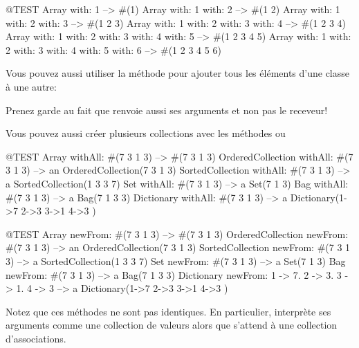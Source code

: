 \documentclass[a4paper,10pt,twoside]{book}
\begin{document}
\begin{code}{@TEST}
Array with: 1 --> #(1)
Array with: 1 with: 2 --> #(1 2)
Array with: 1 with: 2 with: 3 --> #(1 2 3)
Array with: 1 with: 2 with: 3 with: 4 --> #(1 2 3 4)
Array with: 1 with: 2 with: 3 with: 4 with: 5 --> #(1 2 3 4 5)
Array with: 1 with: 2 with: 3 with: 4 with: 5 with: 6 --> #(1 2 3 4 5 6)
\end{code}

Vous pouvez aussi utiliser la méthode  pour ajouter tous les éléments d'une classe à une autre:


\noindent
Prenez garde au fait que  renvoie aussi ses arguments et non pas le receveur!

Vous pouvez aussi créer plusieurs collections avec les méthodes  
 ou 

\begin{code}{@TEST}
Array withAll: #(7 3 1 3)                      --> #(7 3 1 3)
OrderedCollection withAll: #(7 3 1 3) --> an OrderedCollection(7 3 1 3)
SortedCollection withAll: #(7 3 1 3)    --> a SortedCollection(1 3 3 7)
Set withAll: #(7 3 1 3)                         --> a Set(7 1 3)
Bag withAll: #(7 3 1 3)                        --> a Bag(7 1 3 3)
Dictionary withAll: #(7 3 1 3)               --> a Dictionary(1->7 2->3 3->1 4->3 )
\end{code}

\begin{code}{@TEST}
Array newFrom: #(7 3 1 3)                                          --> #(7 3 1 3)
OrderedCollection newFrom: #(7 3 1 3)                     --> an OrderedCollection(7 3 1 3)
SortedCollection newFrom: #(7 3 1 3)                       --> a SortedCollection(1 3 3 7)
Set newFrom: #(7 3 1 3)                                            --> a Set(7 1 3)
Bag newFrom: #(7 3 1 3)                                           --> a Bag(7 1 3 3)
Dictionary newFrom: {1 -> 7. 2 -> 3. 3 -> 1. 4 -> 3} --> a Dictionary(1->7 2->3 3->1 4->3 )
\end{code}
\noindent
Notez que ces méthodes ne sont pas identiques.
En particulier,  interprète 
ses arguments comme une collection de valeurs alors que 
 s'attend à une collection
d'associations.
\end{document}
